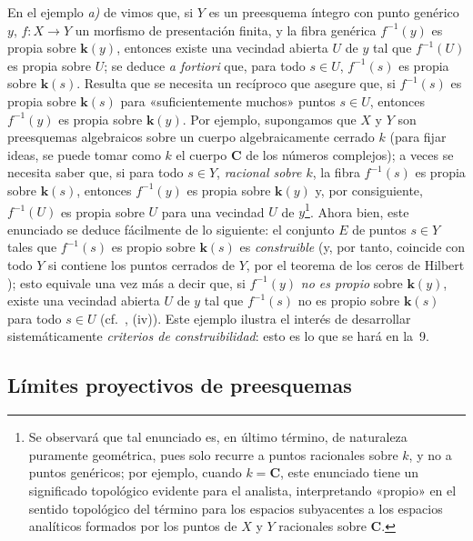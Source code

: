 \begin{env}[8.1.3]
\label{IV.8.1.3-fr}
En el ejemplo \emph{a)} de  vimos que, si $Y$ es un preesquema íntegro con punto genérico $y$, $f:X\to Y$ un morfismo de presentación finita, y la fibra genérica $f^{-1}(y)$ es propia sobre $\boldsymbol k(y)$, entonces existe una vecindad abierta $U$ de $y$ tal que $f^{-1}(U)$ es propia sobre $U$; se deduce \emph{a fortiori} que, para todo $s\in U$, $f^{-1}(s)$ es propia sobre $\boldsymbol k(s)$.
Resulta que se necesita un recíproco que asegure que, si $f^{-1}(s)$ es propia sobre $\boldsymbol k(s)$ para «suficientemente muchos» puntos $s\in U$, entonces $f^{-1}(y)$ es propia sobre $\boldsymbol k(y)$.
Por ejemplo, supongamos que $X$ y $Y$ son preesquemas algebraicos sobre un cuerpo algebraicamente cerrado $k$ (para fijar ideas, se puede tomar como $k$ el cuerpo $\mathbf C$ de los números complejos); a veces se necesita saber que, si para todo $s\in Y$, \emph{racional sobre $k$}, la fibra $f^{-1}(s)$ es propia sobre $\boldsymbol k(s)$, entonces $f^{-1}(y)$ es propia sobre $\boldsymbol k(y)$ y, por consiguiente, $f^{-1}(U)$ es propia sobre $U$ para una vecindad $U$ de $y$\footnote{Se observará que tal enunciado es, en último término, de naturaleza puramente geométrica, pues solo recurre a puntos racionales sobre $k$, y no a puntos genéricos; por ejemplo, cuando $k=\mathbf C$, este enunciado tiene un significado topológico evidente para el analista, interpretando «propio» en el sentido topológico del término para los espacios subyacentes a los espacios analíticos formados por los puntos de $X$ y $Y$ racionales sobre $\mathbf C$.}.
Ahora bien, este enunciado se deduce fácilmente de lo siguiente: el conjunto $E$ de puntos $s\in Y$ tales que $f^{-1}(s)$ es propio sobre $\boldsymbol k(s)$ es \emph{construible} (y, por tanto, coincide con todo $Y$ si contiene los puntos cerrados de $Y$, por el teorema de los ceros de Hilbert ); esto equivale una vez más a decir que, si $f^{-1}(y)$ \emph{no es propio} sobre $\boldsymbol k(y)$, existe una vecindad abierta $U$ de $y$ tal que $f^{-1}(s)$ no es propio sobre $\boldsymbol k(s)$ para todo $s\in U$ (cf.\ , (iv)).
Este ejemplo ilustra el interés de desarrollar sistemáticamente \emph{criterios de construibilidad}: esto es lo que se hará en la \textsection\,9.
\end{env}

\subsection{Límites proyectivos de preesquemas}
\label{subsection:IV.8.2-fr}

